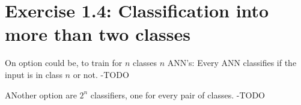 \documentclass{scrartcl}
\begin{document}
\section{Exercise 1.4: Classification into more than two classes}
\begin{enumeration}
\item On option could be, to train for $n$ classes $n$ ANN's: Every ANN classifies if the input is in class $n$ or not. -TODO \\
\item ANother option are $2^n$ classifiers, one for every pair of classes. -TODO

\end{enumeration}
\end{document}
